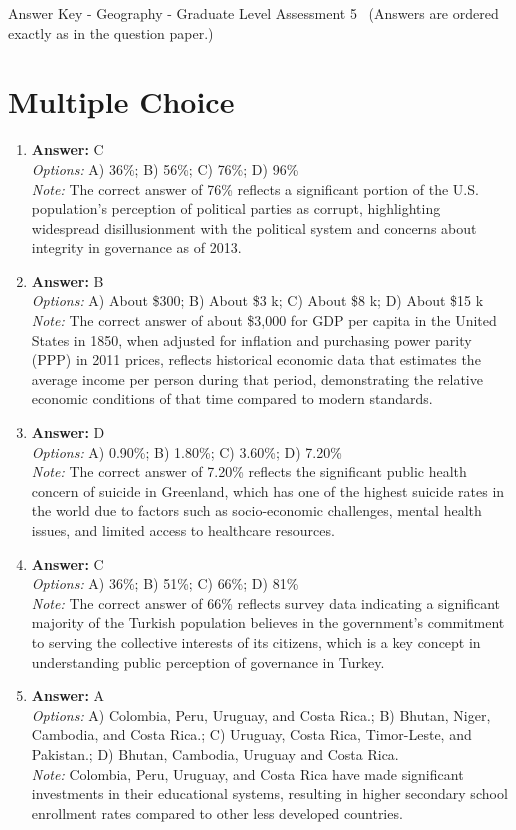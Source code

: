 \documentclass[12pt]{article}
\begin{document}
\begin{center}
Answer Key - Geography - Graduate Level Assessment 5 \
\small (Answers are ordered exactly as in the question paper.)
\end{center}

\section*{Multiple Choice}
\begin{enumerate}[label=\arabic*.]
\item \textbf{Answer:} C
\\ \textit{Options:} A) 36\%; B) 56\%; C) 76\%; D) 96\%
\\ \textit{Note:} The correct answer of 76\% reflects a significant portion of the U.S. population's perception of political parties as corrupt, highlighting widespread disillusionment with the political system and concerns about integrity in governance as of 2013.
\item \textbf{Answer:} B
\\ \textit{Options:} A) About \$300; B) About \$3 k; C) About \$8 k; D) About \$15 k
\\ \textit{Note:} The correct answer of about \$3,000 for GDP per capita in the United States in 1850, when adjusted for inflation and purchasing power parity (PPP) in 2011 prices, reflects historical economic data that estimates the average income per person during that period, demonstrating the relative economic conditions of that time compared to modern standards.
\item \textbf{Answer:} D
\\ \textit{Options:} A) 0.90\%; B) 1.80\%; C) 3.60\%; D) 7.20\%
\\ \textit{Note:} The correct answer of 7.20\% reflects the significant public health concern of suicide in Greenland, which has one of the highest suicide rates in the world due to factors such as socio-economic challenges, mental health issues, and limited access to healthcare resources.
\item \textbf{Answer:} C
\\ \textit{Options:} A) 36\%; B) 51\%; C) 66\%; D) 81\%
\\ \textit{Note:} The correct answer of 66\% reflects survey data indicating a significant majority of the Turkish population believes in the government's commitment to serving the collective interests of its citizens, which is a key concept in understanding public perception of governance in Turkey.
\item \textbf{Answer:} A
\\ \textit{Options:} A) Colombia, Peru, Uruguay, and Costa Rica.; B) Bhutan, Niger, Cambodia, and Costa Rica.; C) Uruguay, Costa Rica, Timor-Leste, and Pakistan.; D) Bhutan, Cambodia, Uruguay and Costa Rica.
\\ \textit{Note:} Colombia, Peru, Uruguay, and Costa Rica have made significant investments in their educational systems, resulting in higher secondary school enrollment rates compared to other less developed countries.
\end{enumerate}
\end{document}
